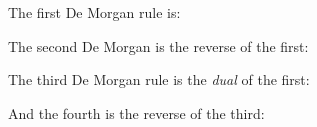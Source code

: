 The first De Morgan rule is:
\begin{highlighted}\begin{fitchproof}
\end{fitchproof}\end{highlighted}
The second De Morgan is the reverse of the first:
\begin{highlighted}\begin{fitchproof}
\end{fitchproof}\end{highlighted}
The third De Morgan rule is the \emph{dual} of the first:
\begin{highlighted}\begin{fitchproof}
\end{fitchproof}\end{highlighted}
And the fourth is the reverse of the third:
\begin{highlighted}\begin{fitchproof}
\end{fitchproof}\end{highlighted}
\bigskip



